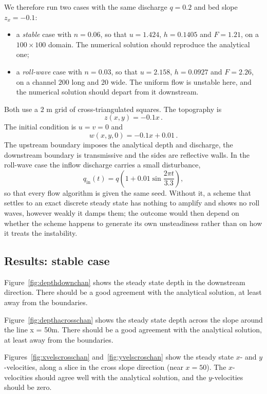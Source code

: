 We therefore run two cases with the same discharge $q=0.2$ and bed slope
$z_x=-0.1$:
\begin{itemize}
\item a \emph{stable} case with $n=0.06$, so that $u=1.424$, $h=0.1405$ and
  $F=1.21$, on a $100 \times 100$ domain. The numerical solution should
  reproduce the analytical one;
\item a \emph{roll-wave} case with $n=0.03$, so that $u=2.158$, $h=0.0927$ and
  $F=2.26$, on a channel $200$ long and $20$ wide. The uniform flow is
  unstable here, and the numerical solution should depart from it
  downstream.
\end{itemize}
Both use a $2$ m grid of cross-triangulated squares. The topography is
\begin{equation}
z(x, y)= -0.1 x\,.
\end{equation}
The initial condition is $u=v=0$ and
\begin{equation}
w(x,y,0)= -0.1 x + 0.01\,.
\end{equation}
The upstream boundary imposes the analytical depth and discharge, the
downstream boundary is transmissive and the sides are reflective walls.
In the roll-wave case the inflow discharge carries a small disturbance,
\begin{equation}
q_{\mathrm{in}}(t) = q \left(1 + 0.01 \sin \frac{2\pi t}{3.3}\right),
\end{equation}
so that every flow algorithm is given the same seed. Without it, a scheme that
settles to an exact discrete steady state has nothing to amplify and shows no
roll waves, however weakly it damps them; the outcome would then depend on
whether the scheme happens to generate its own unsteadiness rather than on
how it treats the instability.

\subsection{Results: stable case}
Figure~\ref{fig:depthdownchan} shows the steady state depth in the downstream direction.
There should be a good agreement with the analytical solution, at least away from the boundaries.

Figure~\ref{fig:depthacrosschan} shows the steady state depth across the slope around the line x = 50m.
There should be a good agreement with the analytical solution, at least away from the boundaries.

Figures~\ref{fig:xvelscrosschan} and~\ref{fig:yvelscroschan} show the steady state $x$- and $y$-velocities, along a slice in the cross slope direction (near $x=50$). The $x$-velocities should agree well with the analytical solution, and the $y$-velocities should be zero.

